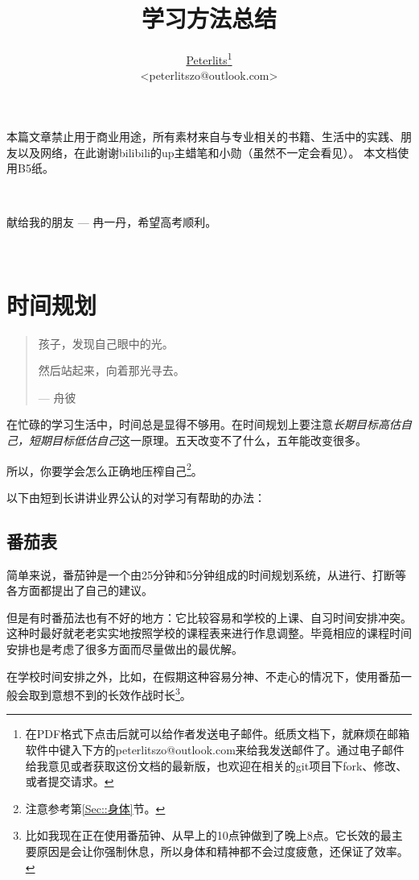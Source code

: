 \documentclass[b5paper]{ctexart}
\title{学习方法总结}
\author{\href{mailto:peterlitszo@outlook.com}{Peterlits}\footnote{在PDF格式下点击后就可以给作者发送电子邮件。纸质文档下，就麻烦在邮箱软件中键入下方的peterlits\-zo\-@\-outlook.com来给我发送邮件了。通过电子邮件给我意见或者获取这份文档的最新版，也欢迎在相关的git项目下fork、修改、或者提交请求。}\\\small{<peterlitszo@outlook.com>}}
\begin{document}
	\maketitle
	\newpage
	\tableofcontents
	\newpage

	\thispagestyle{empty}
	\parbox[t][15em]{\textwidth}{}

	本篇文章禁止用于商业用途，所有素材来自与专业相关的书籍、生活中的实践、朋友以及网络，在此谢谢bilibili的up主蜡笔和小勋（虽然不一定会看见）。
	本文档使用B5纸。

	\ \newline

	献给我的朋友 --- 冉一丹，希望高考顺利。

	\ \newline

	\section{时间规划}
		\begin{quote}
			孩子，发现自己眼中的光。

			然后站起来，向着那光寻去。

			\begin{flushright}
				--- 舟彼
			\end{flushright}
		\end{quote}

		在忙碌的学习生活中，时间总是显得不够用。在时间规划上要注意\emph{长期目标高估自己，短期目标低估自己}这一原理。五天改变不了什么，五年能改变很多。

		所以，你要学会怎么正确地压榨自己\footnote{注意参考第\ref{Sec::身体}节。}。

		以下由短到长讲讲业界公认的对学习有帮助的办法：

		\subsection{番茄表}
			简单来说，番茄钟是一个由25分钟和5分钟组成的时间规划系统，从进行、打断等各方面都提出了自己的建议。

			但是有时番茄法也有不好的地方：它比较容易和学校的上课、自习时间安排冲突。这种时最好就老老实实地按照学校的课程表来进行作息调整。毕竟相应的课程时间安排也是考虑了很多方面而尽量做出的最优解。

			在学校时间安排之外，比如，在假期这种容易分神、不走心的情况下，使用番茄一般会取到意想不到的长效作战时长\footnote{比如我现在正在使用番茄钟、从早上的10点钟做到了晚上8点。它长效的最主要原因是会让你强制休息，所以身体和精神都不会过度疲惫，还保证了效率。}。
\end{document}
